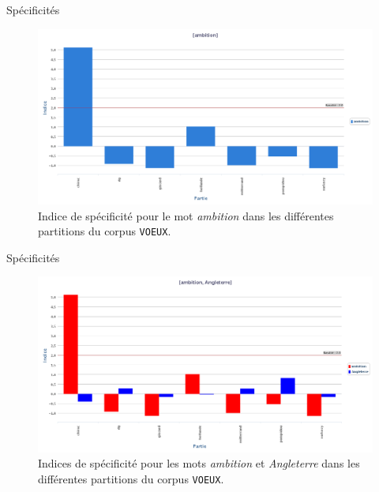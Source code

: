 \documentclass[xetex,xcolor={table,usenames,dvipsnames}]{beamer}
\begin{document}
\begin{frame}{Spécificités}
	\begin{figure}[h] %
		\centering
		\includegraphics[width=1\linewidth]{img/ambition_specificites.png}
		\caption{Indice de spécificité pour le mot \textit{ambition} dans les différentes partitions du corpus \texttt{VOEUX}.}
		\label{fig:ling_out_TAL}
	\end{figure}
\end{frame}

\begin{frame}{Spécificités}
	\begin{figure}[h] %
		\centering
		\includegraphics[width=1\linewidth]{img/ambition_angleterre.png}
		\caption{Indices de spécificité pour les mots \textit{ambition} et \textit{Angleterre} dans les différentes partitions du corpus \texttt{VOEUX}.}
		\label{fig:ling_out_TAL}
	\end{figure}
\end{frame}
\end{document}
